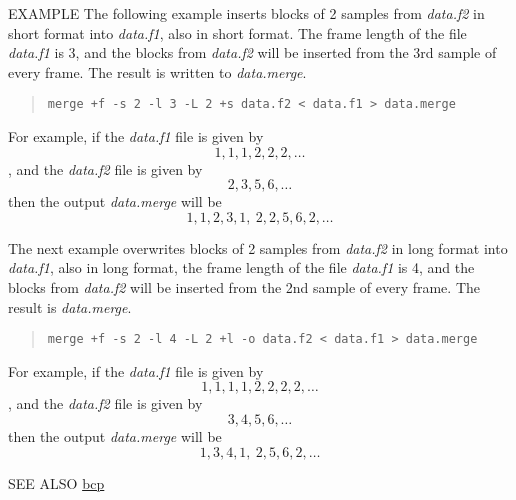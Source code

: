 \begin{qsection}{EXAMPLE}
The following example inserts blocks of 2 samples from {\em data.f2}
in short format into {\em data.f1}, also in short format.
The frame length of the file {\em data.f1} is 3, and the blocks
from {\em data.f2} will be inserted from the 3rd sample of
every frame.
The result is written to {\em data.merge}.
\begin{quote}
 \verb!merge +f -s 2 -l 3 -L 2 +s data.f2 < data.f1 > data.merge!
\end{quote}
For example, if the {\em data.f1} file is given by
\[ 1,1,1,2,2,2,\dots \], 
and the {\em data.f2} file is given by
\[ 2,3,5,6,\dots \]
then the output {\em data.merge} will be 
\[ 1,1,2,3,1,~ 2,2,5,6,2,\dots \] 

The next example overwrites blocks of 2 samples from {\em data.f2}
in long format into {\em data.f1}, also in long format,
the frame length of the file {\em data.f1} is 4, and the blocks
from {\em data.f2} will be inserted from the 2nd sample of
every frame.
The result is {\em data.merge}.
\begin{quote}
 \verb!merge +f -s 2 -l 4 -L 2 +l -o data.f2 < data.f1 > data.merge!
\end{quote}
For example, if the {\em data.f1} file is given by
\[ 1,1,1,1,2,2,2,2,\dots \], 
and the {\em data.f2} file is given by
\[ 3,4,5,6,\dots \]
then the output {\em data.merge} will be 
\[  1,3,4,1,~ 2,5,6,2,\dots \] 

\end{qsection}

\begin{qsection}{SEE ALSO}
\hyperlink{bcp}{bcp}
\end{qsection}
